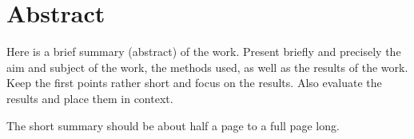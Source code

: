 \chapter*{Abstract}
Here is a brief summary (abstract) of the work. Present briefly and precisely the aim and subject of the work, the methods used, as well as the results of the work. Keep the first points rather short and focus on the results. Also evaluate the results and place them in context.

The short summary should be about half a page to a full page long.
